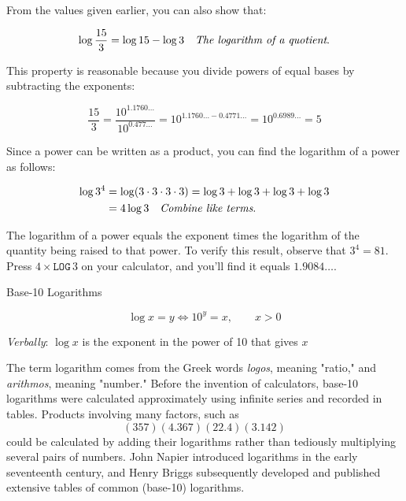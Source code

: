 From the values given earlier, you can also show that:

\[
\log \frac{15}{3} = \log 15 - \log 3 \quad \text{\textit{The logarithm of a quotient}.}
\]

This property is reasonable because you divide powers of equal bases by subtracting the exponents:

\[
\frac{15}{3} = \frac{10^{1.1760 \ldots}}{10^{0.477 \ldots}} = 10^{1.1760 \ldots - 0.4771 \ldots} = 10^{0.6989 \ldots} = 5
\]

Since a power can be written as a product, you can find the logarithm of a power as follows:

\[
\begin{aligned}
\log 3^4 & = \log (3 \cdot 3 \cdot 3 \cdot 3) = \log 3 + \log 3 + \log 3 + \log 3 \\
& = 4 \log 3 \quad \text{\textit{Combine like terms}.}
\end{aligned}
\]

The logarithm of a power equals the exponent times the logarithm of the quantity being raised to that power. To verify this result, observe that \(3^4 = 81\). Press \(4 \times \texttt{LOG}\,3\) on your calculator, and you'll find it equals \(1.9084 \ldots\).

\begin{definition}{Base-10 Logarithms}

\[
\log x=y \iff 10^y=x, \qquad x>0
\]

\textit{Verbally}: $\log x$ is the exponent in the power of 10 that gives $x$   
\end{definition}

The term logarithm comes from the Greek words \emph{logos}, meaning "ratio," and \emph{arithmos}, meaning "number." Before the invention of calculators, base-10 logarithms were calculated approximately using infinite series and recorded in tables. Products involving many factors, such as
\[
(357)(4.367)(22.4)(3.142)
\]
could be calculated by adding their logarithms rather than tediously multiplying several pairs of numbers. John Napier introduced logarithms in the early seventeenth century, and Henry Briggs subsequently developed and published extensive tables of common (base-10) logarithms.

